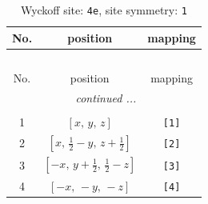 \documentclass[fleqn,8pt]{jsarticle}
\begin{document}
\begin{longtable}{ccc}
\caption{Wyckoff site: {\tt 4e}, site symmetry: {\tt 1}}
 \\
 \hline \hline
No. & position & mapping \\ \hline \endfirsthead

\multicolumn{2}{l}{\tablename\ \thetable{}} \\
 \hline \hline
No. & position & mapping \\ \hline \endhead

 \hline \hline
\multicolumn{2}{r}{\footnotesize\it continued ...} \\ \endfoot

 \hline \hline
\multicolumn{2}{r}{} \\ \endlastfoot

1 & $\left[ x,\, y,\, z \right]$ & {\tt [1]} \\ \hline
2 & $\left[ x,\, \frac{1}{2} - y,\, z + \frac{1}{2} \right]$ & {\tt [2]} \\ \hline
3 & $\left[ - x,\, y + \frac{1}{2},\, \frac{1}{2} - z \right]$ & {\tt [3]} \\ \hline
4 & $\left[ - x,\, - y,\, - z \right]$ & {\tt [4]} \\
\end{longtable}
\end{document}

